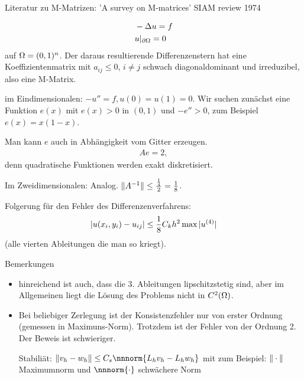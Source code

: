 
Literatur zu M-Matrizen: 'A survey on M-matrices' SIAM review 1974

\begin{beispiel}
  \begin{align*}
&    -\Delta u = f\\
& u|_{\partial \Omega} = 0
  \end{align*}
auf $ \Omega = (0,1)^n$. Der daraus resultierende Differenzenstern hat eine Koeffizientenmatrix mit $a_{ij} \leq 0$, $i \neq j$ schwach diagonaldominant und irreduzibel, also eine M-Matrix.

im Eindimensionalen: $-u'' = f, u(0) = u(1) = 0$. Wir suchen zunächst eine Funktion $e(x)$ mit $e(x)>0$ in $(0,1)$ und $-e''>0$, zum Beispiel $e(x) = x(1-x)$.

Man kann $e$ auch in Abhängigkeit vom Gitter erzeugen.
\begin{align*}
  Ae = 2,
\end{align*} 
denn quadratische Funktionen werden exakt diskretisiert.

Im Zweidimensionalen: Analog. $\|A^{-1}\| \leq \frac{\frac 1 4}{2} = \frac 1 8$. 

Folgerung für den Fehler des Differenzenverfahrens:
\begin{align*}
  |u(x_i, y_i)-u_{ij}|\leq \frac 1 8 C_k h^2 \max |u^{(4)}|
\end{align*}
(alle vierten Ableitungen die man so kriegt).

Bemerkungen
\begin{itemize}
\item hinreichend ist auch, dass die 3. Ableitungen lipschitzstetig sind, aber im Allgemeinen liegt die Lösung des Problems nicht in $C^2(\Omega)$.
\item Bei beliebiger Zerlegung ist der Konsistenzfehler nur von erster Ordnung (gemessen in Maximuns-Norm). Trotzdem ist der Fehler von der Ordnung 2. Der Beweis ist schwieriger.

Stabiliät: $\nnorm{v_h -w_h} \leq C_s \nnnorm{L_hv_h - L_hw_h}$ mit zum Beispiel: $\|\cdot\|$ Maximumnorm und $\nnnorm{\cdot}$ schwächere Norm
\end{itemize}
\end{beispiel}
